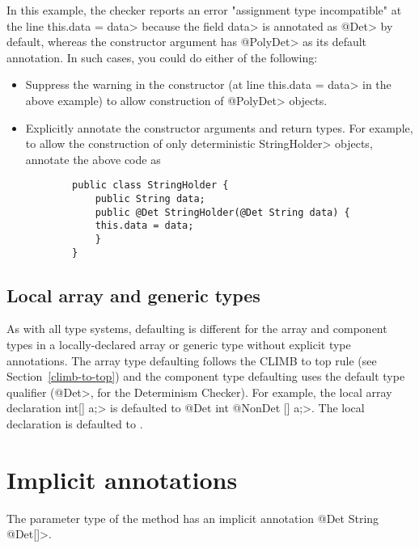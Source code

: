 In this example, the checker reports an error "assignment type incompatible"
at the line \<this.data = data> because the field \<data> is annotated as
\<@Det> by default, whereas the constructor argument has \<@PolyDet>
as its default annotation. In such cases, you could do either of the following:
\begin{itemize}
    \item Suppress the warning in the constructor (at line \<this.data = data> in the above example)
    to allow construction of \<@PolyDet> objects.
    \item Explicitly annotate the constructor arguments and return types. For example, to allow
    the construction of only deterministic \<StringHolder> objects, annotate the above code as
    \begin{Verbatim}
        public class StringHolder {
            public String data;
            public @Det StringHolder(@Det String data) {
            this.data = data;
            }
        }
    \end{Verbatim}
\end{itemize}

\subsection{Local array and generic types\label{determinism-array-defaults}}
As with all type systems, defaulting is different for the array and
component types in a locally-declared array or generic type without explicit type
annotations.
The array type defaulting follows the CLIMB to top rule (see Section~\ref{climb-to-top}) and
the component type defaulting uses the default type qualifier (\<@Det>, for
the Determinism Checker).
For example, the local array declaration \<int[] a;> is defaulted to \<@Det int @NonDet [] a;>.
The local declaration  is defaulted to
.

\section{Implicit annotations\label{determinism-implicits}}
The parameter type of the  method has an implicit annotation
\<@Det String @Det[]>.

